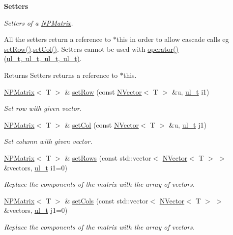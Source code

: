 \begin{Indent}\textbf{ Setters}\par
{\em Setters of a {\ttfamily \mbox{\hyperlink{class_n_p_matrix}{N\+P\+Matrix}}}.

All the setters return a reference to {\ttfamily $\ast$this} in order to allow cascade calls eg {\ttfamily \mbox{\hyperlink{class_n_p_matrix_aac65ad5cc7a3a73b8eddbd8501957ca6}{set\+Row()}}.\mbox{\hyperlink{class_n_p_matrix_ac950c160738743255b84702fca1e521d}{set\+Col()}}}. Setters cannot be used with {\ttfamily \mbox{\hyperlink{class_n_p_matrix_a5f7e5d337efe283e3f88716bd2205d55}{operator()(ul\+\_\+t, ul\+\_\+t, ul\+\_\+t, ul\+\_\+t)}}}. \begin{DoxyReturn}{Returns}
Setters returns a reference to {\ttfamily $\ast$this}. 
\end{DoxyReturn}
}\begin{DoxyCompactItemize}
\item 
\mbox{\hyperlink{class_n_p_matrix}{N\+P\+Matrix}}$<$ T $>$ \& \mbox{\hyperlink{class_n_p_matrix_aac65ad5cc7a3a73b8eddbd8501957ca6}{set\+Row}} (const \mbox{\hyperlink{class_n_vector}{N\+Vector}}$<$ T $>$ \&u, \mbox{\hyperlink{typedef_8h_a1b140a2034db3f5dfe18a987745df43a}{ul\+\_\+t}} i1)
\begin{DoxyCompactList}\small\item\em Set row with given vector. \end{DoxyCompactList}\item 
\mbox{\hyperlink{class_n_p_matrix}{N\+P\+Matrix}}$<$ T $>$ \& \mbox{\hyperlink{class_n_p_matrix_ac950c160738743255b84702fca1e521d}{set\+Col}} (const \mbox{\hyperlink{class_n_vector}{N\+Vector}}$<$ T $>$ \&u, \mbox{\hyperlink{typedef_8h_a1b140a2034db3f5dfe18a987745df43a}{ul\+\_\+t}} j1)
\begin{DoxyCompactList}\small\item\em Set column with given vector. \end{DoxyCompactList}\item 
\mbox{\hyperlink{class_n_p_matrix}{N\+P\+Matrix}}$<$ T $>$ \& \mbox{\hyperlink{class_n_p_matrix_afb8343a5938040ffe7090712d0ea000f}{set\+Rows}} (const std\+::vector$<$ \mbox{\hyperlink{class_n_vector}{N\+Vector}}$<$ T $>$ $>$ \&vectors, \mbox{\hyperlink{typedef_8h_a1b140a2034db3f5dfe18a987745df43a}{ul\+\_\+t}} i1=0)
\begin{DoxyCompactList}\small\item\em Replace the components of the matrix with the array of vectors. \end{DoxyCompactList}\item 
\mbox{\hyperlink{class_n_p_matrix}{N\+P\+Matrix}}$<$ T $>$ \& \mbox{\hyperlink{class_n_p_matrix_a16109b850d3e267e30883ddcf8d88928}{set\+Cols}} (const std\+::vector$<$ \mbox{\hyperlink{class_n_vector}{N\+Vector}}$<$ T $>$ $>$ \&vectors, \mbox{\hyperlink{typedef_8h_a1b140a2034db3f5dfe18a987745df43a}{ul\+\_\+t}} j1=0)
\begin{DoxyCompactList}\small\item\em Replace the components of the matrix with the array of vectors. \end{DoxyCompactList}\end{DoxyCompactItemize}
\end{Indent}
